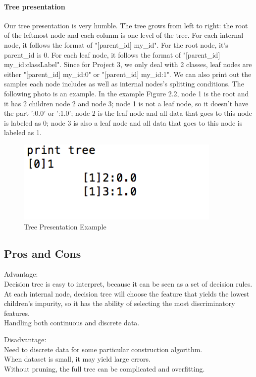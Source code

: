 \documentclass[paper=letter, fontsize=11pt]{article}
\numberwithin{equation}{section}		%
\numberwithin{figure}{section}			%
\numberwithin{table}{section}				%
\begin{document}
\paragraph{Tree presentation}Our tree presentation is very humble. The tree grows from left to right: the root of
the leftmost node and each colunm is one level of the tree. For each internal node,
it follows the format of "[parent{\_}id] my{\_}id". For the root node, it's parent{\_}id is 0.
For each leaf node, it follows the format of "[parent{\_}id] my{\_}id:classLabel". Since for
Project 3, we only deal with 2 classes, leaf nodes are either "[parent{\_}id] my{\_}id:0" or
"[parent{\_}id] my{\_}id:1". We can also print out the samples each node includes as well
as internal nodes's splitting conditions. The following photo is an example. In the example Figure 2.2, node 1 is the root and it has 2 children node 2 and node 3;
node 1 is not a leaf node, so  it doesn't have the part ':0.0' or ':1.0';
node 2 is the leaf node and all data that goes to this node is labeled as 0;
node 3 is also a leaf node and all data that goes to this node is labeled as 1.

\begin{figure}[h]
  \centering
  \includegraphics[width=0.8\linewidth,height=4cm]{tree_presentation_example.png}
  \caption{Tree Presentation Example}
\end{figure}

\subsection{Pros and Cons}
Advantage:\\
Decision tree is easy to interpret, because it can be seen as a set of decision rules. \\
At each internal node,  decision tree will choose the feature that yields the lowest children's impurity, so it has the ability of selecting the most discriminatory features.\\
Handling both continuous and discrete data.

\noindent Disadvantage:\\
Need to discrete data for some particular construction algorithm.\\
When dataset is small, it may yield large errors.\\
Without pruning, the full tree can be complicated and overfitting.
\end{document}
